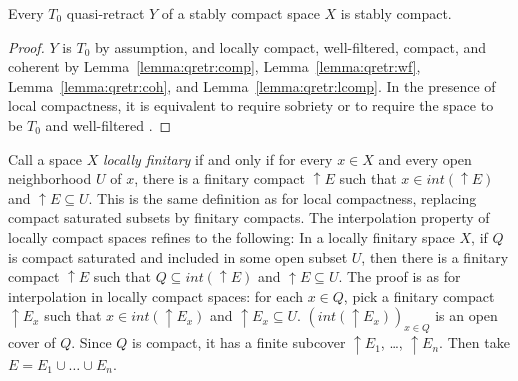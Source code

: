 \documentclass{LMCS}
\newcommand\upc{\mathop{\uparrow}\nolimits}
\newcommand{\interior}[1]{int ({#1})} \newcommand{\biginterior}[1]{\interior{#1}}
\begin{document}
\begin{prop}
  \label{prop:qretr:scomp}
  Every $T_0$ quasi-retract $Y$ of a stably compact space $X$ is
  stably compact.
\end{prop}
\begin{proof}
  $Y$ is $T_0$ by assumption, and locally compact, well-filtered,
  compact, and coherent by Lemma~\ref{lemma:qretr:comp},
  Lemma~\ref{lemma:qretr:wf}, Lemma~\ref{lemma:qretr:coh}, and
  Lemma~\ref{lemma:qretr:lcomp}.  In the presence of local
  compactness, it is equivalent to require sobriety or to require the
  space to be $T_0$ and well-filtered
  \cite[Theorem~II-1.21]{GHKLMS:contlatt}.
\end{proof}

Call a space $X$ \emph{locally finitary} if and only if for every $x
\in X$ and every open neighborhood $U$ of $x$, there is a finitary
compact $\upc E$ such that $x \in \interior {\upc E}$ and $\upc E
\subseteq U$.  This is the same definition as for local compactness,
replacing compact saturated subsets by finitary compacts.  The
interpolation property of locally compact spaces refines to the
following: In a locally finitary space $X$, if $Q$ is compact
saturated and included in some open subset $U$, then there is a
finitary compact $\upc E$ such that $Q \subseteq \interior {\upc E}$
and $\upc E \subseteq U$.  The proof is as for interpolation in
locally compact spaces: for each $x \in Q$, pick a finitary compact
$\upc E_x$ such that $x \in \interior {\upc E_x}$ and $\upc E_x
\subseteq U$.  ${(\interior {\upc E_x})}_{x \in Q}$ is an open cover
of $Q$.  Since $Q$ is compact, it has a finite subcover $\upc E_1$,
\ldots, $\upc E_n$.  Then take $E = E_1 \cup \ldots \cup E_n$.
\end{document}
